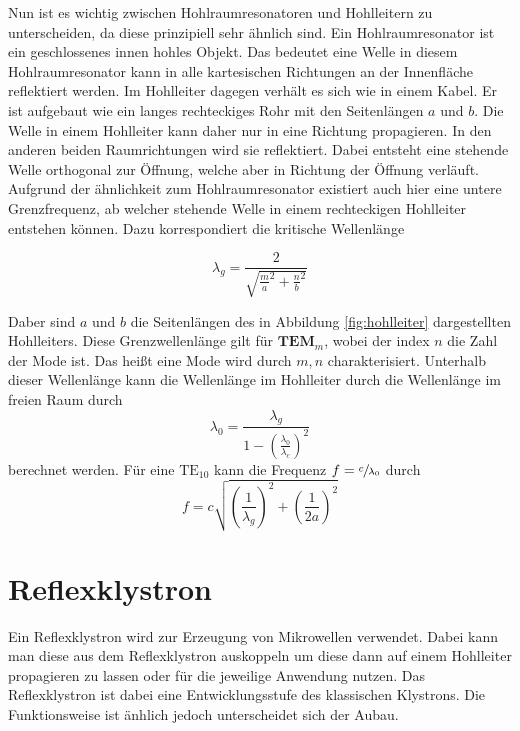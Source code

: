 Nun ist es wichtig zwischen Hohlraumresonatoren und Hohlleitern zu unterscheiden, da diese 
prinzipiell sehr ähnlich sind. Ein Hohlraumresonator ist ein geschlossenes innen hohles Objekt. Das bedeutet eine Welle in diesem Hohlraumresonator kann in alle kartesischen Richtungen
an der Innenfläche reflektiert werden. Im Hohlleiter dagegen verhält es sich wie in einem Kabel. Er ist aufgebaut wie ein langes rechteckiges Rohr mit den Seitenlängen $a$ und $b$. Die 
Welle in einem Hohlleiter kann daher nur in eine Richtung propagieren. In den anderen beiden Raumrichtungen wird sie reflektiert. Dabei entsteht eine stehende Welle orthogonal zur 
Öffnung, welche aber in Richtung der Öffnung verläuft. Aufgrund der ähnlichkeit zum Hohlraumresonator existiert auch hier eine untere Grenzfrequenz, ab welcher stehende Welle 
in einem rechteckigen Hohlleiter entstehen können. Dazu korrespondiert die kritische Wellenlänge 

\begin{equation}
              \label{eqn:lambda_g}
              \lambda_g = \frac{2}{\sqrt{\frac{m}{a}^2+\frac{n}{b}^2}}%
\end{equation}

Daber sind $a$ und $b$ die Seitenlängen des in Abbildung \ref{fig:hohlleiter} dargestellten Hohlleiters. Diese Grenzwellenlänge gilt für $\textbf{TEM}_m$, wobei der index $n$ die Zahl 
der Mode ist. Das heißt eine Mode wird durch $m,n$ charakterisiert. Unterhalb dieser Wellenlänge kann die Wellenlänge im Hohlleiter durch die Wellenlänge im freien Raum durch 
\begin{equation}
              \label{eqn:lambda_g}
              \lambda_0 = \frac{\lambda_g}{1-\left(\frac{\lambda_0}{\lambda_c}\right)^2}
\end{equation}
berechnet werden. 
Für eine $\mathrm{TE}_{10}$ kann die Frequenz $f = \sfrac{c}{\lambda_0}$ durch 
\begin{equation}
              \label{eqn:TE01}
              f = c\sqrt{\left(\frac{1}{\lambda_g}\right)^2+\left(\frac{1}{2a}\right)^2}
\end{equation}


\section{Reflexklystron}
\label{sec:reflexklystron}
Ein Reflexklystron wird zur Erzeugung von Mikrowellen verwendet. Dabei kann man diese aus dem Reflexklystron auskoppeln um diese dann auf einem Hohlleiter propagieren zu lassen oder 
für die jeweilige Anwendung nutzen. Das Reflexklystron ist dabei eine Entwicklungsstufe des klassischen Klystrons. Die Funktionsweise ist änhlich jedoch unterscheidet sich der Aubau.
